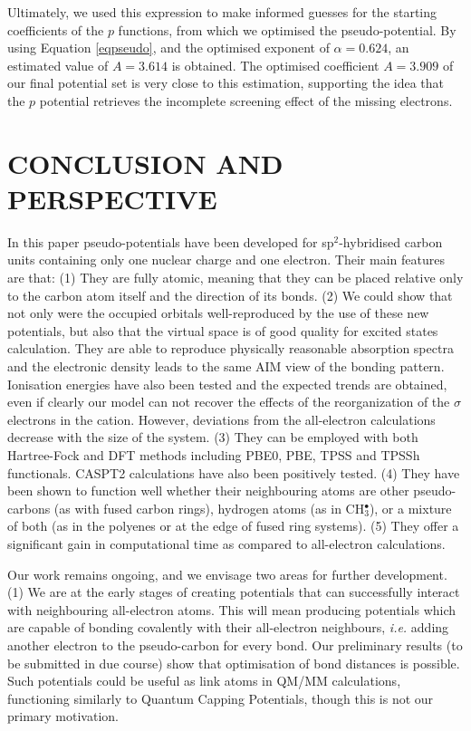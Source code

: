 \documentclass[12pt]{article}
\begin{document}
Ultimately, we used this expression to make informed guesses for the starting coefficients of the $p$ functions, from which we optimised the pseudo-potential.
By using Equation \ref{eqpseudo}, and the optimised exponent of $\alpha=0.624$, an estimated value of $A=3.614$ is obtained.  
The optimised coefficient $A=3.909$ of our final potential set is very close to this estimation, 
supporting the idea that the $p$ potential retrieves the incomplete screening effect of the missing electrons. 

\section*{\sffamily \Large CONCLUSION AND PERSPECTIVE}

In this paper pseudo-potentials have been developed for sp$^{2}$-hybridised carbon units containing only one nuclear charge and one electron. 
Their main features are that: 
(1) They are fully atomic, meaning that they can be placed relative only to the carbon atom itself and the direction of its bonds. 
(2) We could show that not only were the occupied orbitals well-reproduced by the use of these new potentials, but also that the virtual space is of good quality for excited states calculation. 
They are able to reproduce physically reasonable absorption spectra and the electronic
density leads to the same AIM view of the bonding pattern. Ionisation energies have
also been tested and the expected trends are obtained, even if clearly our
model can not recover the effects of the reorganization of the $\sigma$ electrons
in the cation. However, deviations
from the all-electron calculations decrease with the size of the system.
(3) They can be employed with both Hartree-Fock and DFT methods including PBE0, PBE, TPSS and TPSSh functionals. 
CASPT2 calculations have also been positively tested.
(4) They have been shown to function well whether their neighbouring atoms are other pseudo-carbons (as with fused carbon rings), hydrogen atoms (as in CH\(^{\bullet}_{3}\)),
or a mixture of both (as in the polyenes or at the edge of fused ring systems). 
(5) They offer a significant gain in computational time as compared to all-electron calculations.

Our work remains ongoing, and we envisage two areas for further development.
(1) We are at the early stages of creating potentials that can successfully interact with neighbouring all-electron atoms.
This will mean producing potentials which are capable of bonding covalently with their all-electron neighbours, \textsl{i.e.} adding another electron to the pseudo-carbon for every bond.
Our preliminary results (to be submitted in due course) show that optimisation of bond distances is possible.
Such potentials could be useful as link atoms in QM/MM calculations, functioning similarly to Quantum Capping Potentials,\cite{dilabio_simple_2002} though this is not our primary motivation.
\end{document}
